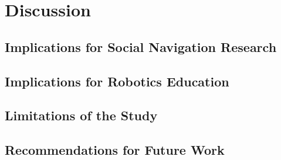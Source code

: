 
\chapter{Discussion} %

\label{Chapter6} %


\section{Implications for Social Navigation Research}


\section{Implications for Robotics Education}


\section{Limitations of the Study}


\section{Recommendations for Future Work}